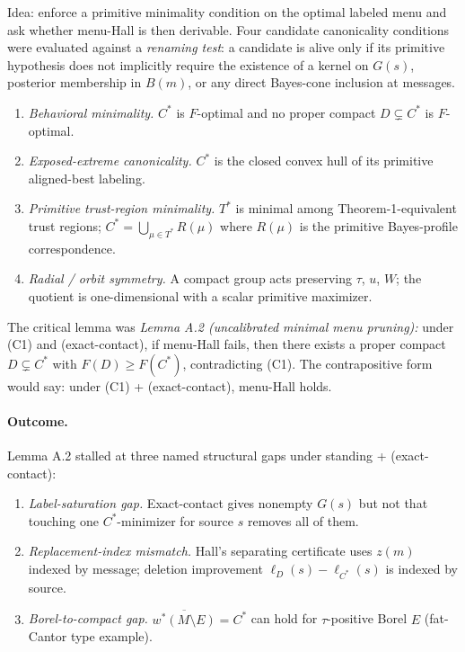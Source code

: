 \documentclass[11pt]{article}
\theoremstyle{definition}
\theoremstyle{remark}
\begin{document}
Idea: enforce a primitive minimality condition on the optimal
labeled menu and ask whether menu-Hall is then derivable. Four
candidate canonicality conditions were evaluated against a
\emph{renaming test}: a candidate is alive only if its primitive
hypothesis does not implicitly require the existence of a kernel on
$G(s)$, posterior membership in $B(m)$, or any direct Bayes-cone
inclusion at messages.
\begin{enumerate}[leftmargin=2em]
\item[(C1)] \emph{Behavioral minimality.} $C^*$ is $F$-optimal and
no proper compact $D \subsetneq C^*$ is $F$-optimal.
\item[(C2)] \emph{Exposed-extreme canonicality.} $C^*$ is the closed
convex hull of its primitive aligned-best labeling.
\item[(C3)] \emph{Primitive trust-region minimality.} $T^*$ is
minimal among Theorem-1-equivalent trust regions; $C^* = \bigcup_{\mu\in T^*} R(\mu)$
where $R(\mu)$ is the primitive Bayes-profile correspondence.
\item[(C4)] \emph{Radial / orbit symmetry.} A compact group acts
preserving $\tau$, $u$, $W$; the quotient is one-dimensional with a
scalar primitive maximizer.
\end{enumerate}

The critical lemma was \emph{Lemma A.2 (uncalibrated minimal menu
pruning):} under (C1) and (exact-contact), if menu-Hall fails, then
there exists a proper compact $D \subsetneq C^*$ with $F(D) \ge F(C^*)$,
contradicting (C1). The contrapositive form would say: under (C1) +
(exact-contact), menu-Hall holds.

\paragraph{Outcome.} Lemma A.2 stalled at three named structural
gaps under standing + (exact-contact):
\begin{enumerate}[leftmargin=2em]
\item \emph{Label-saturation gap.} Exact-contact gives nonempty
$G(s)$ but not that touching one $C^*$-minimizer for source $s$
removes all of them.
\item \emph{Replacement-index mismatch.} Hall's separating
certificate uses $z(m)$ indexed by message; deletion improvement
$\ell_D(s) - \ell_{C^*}(s)$ is indexed by source.
\item \emph{Borel-to-compact gap.} $\overline{w^*(M\setminus E)} = C^*$
can hold for $\tau$-positive Borel $E$ (fat-Cantor type example).
\end{enumerate}
\end{document}

